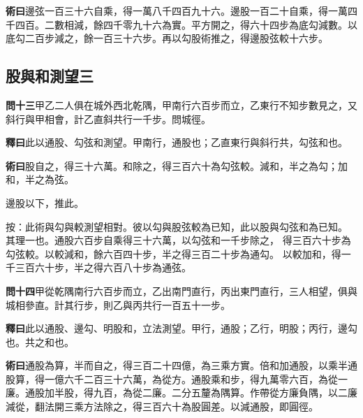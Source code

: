 \documentclass[12pt,a4paper]{article}
\newcommand{\Section}[1]{\subsection*{#1}}
\begin{document}
\vspace{0.3em}

\noindent\textbf{術曰}\quad 邊弦一百三十六自乘，得一萬八千四百九十六。邊股一百二十自乘，得一萬四千四百。二數相減，餘四千零九十六為實。平方開之，得六十四步為底勾減數。以底勾二百步減之，餘一百三十六步。再以勾股術推之，得邊股弦較十六步。

\Section{股與和測望三}

\noindent\textbf{問十三}\quad 甲乙二人俱在城外西北乾隅，甲南行六百步而立，乙東行不知步數見之，又斜行與甲相會，計乙直斜共行一千步。問城徑。

\vspace{0.3em}

\noindent\textbf{釋曰}\quad 此以通股、勾弦和測望。甲南行，通股也；乙直東行與斜行共，勾弦和也。

\vspace{0.3em}

\noindent\textbf{術曰}\quad 股自之，得三十六萬。和除之，得三百六十為勾弦較。減和，半之為勾；加和，半之為弦。

邊股以下，推此。

\vspace{0.3em}

\noindent
按：此術與勾與較測望相對。彼以勾與股弦較為已知，此以股與勾弦和為已知。
其理一也。通股六百步自乘得三十六萬，以勾弦和一千步除之，
得三百六十步為勾弦較。以較減和，餘六百四十步，半之得三百二十步為通勾。
以較加和，得一千三百六十步，半之得六百八十步為通弦。

\vspace{0.5em}

\noindent\textbf{問十四}\quad 甲從乾隅南行六百步而立，乙出南門直行，丙出東門直行，三人相望，俱與城相參直。計其行步，則乙與丙共行一百五十一步。

\vspace{0.3em}

\noindent\textbf{釋曰}\quad 此以通股、邊勾、明股和，立法測望。甲行，通股；乙行，明股；丙行，邊勾也。共之和也。

\vspace{0.3em}

\noindent\textbf{術曰}\quad 通股為算，半而自之，得三百二十四億，為三乘方實。倍和加通股，以乘半通股算，得一億六千二百三十六萬，為從方。通股乘和步，得九萬零六百，為從一廉。通股加半股，得九百，為從二廉。二分五釐為隅算。作帶從方廉負隅，以二廉減從，翻法開三乘方法除之，得三百六十為股圓差。以減通股，即圓徑。
\end{document}
